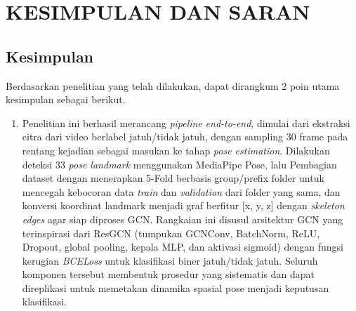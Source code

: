 \newpage
\chapter{KESIMPULAN DAN SARAN} \label{Bab V}

\section{Kesimpulan} \label{V.Kesimpulan}
Berdasarkan penelitian yang telah dilakukan, dapat dirangkum 2 poin utama kesimpulan sebagai berikut. 

\begin{enumerate}
    \item Penelitian ini berhasil merancang \textit{pipeline} \textit{end-to-end}, dimulai dari ekstraksi citra dari video berlabel jatuh/tidak jatuh, dengan sampling 30 frame pada rentang kejadian sebagai masukan ke tahap \textit{pose estimation}. Dilakukan deteksi 33 \textit{pose landmark} menggunakan MediaPipe Pose, lalu Pembagian dataset dengan menerapkan 5-Fold berbasis group/prefix folder untuk mencegah kebocoran data \textit{train} dan \textit{validation} dari folder yang sama, dan konversi koordinat landmark menjadi graf berfitur [x, y, z] dengan \textit{skeleton edges} agar siap diproses GCN. Rangkaian ini disusul arsitektur GCN yang terinspirasi dari ResGCN (tumpukan GCNConv, BatchNorm, ReLU, Dropout, global pooling, kepala MLP, dan aktivasi sigmoid) dengan fungsi kerugian \textit{BCELoss} untuk klasifikasi biner jatuh/tidak jatuh. Seluruh komponen tersebut membentuk prosedur yang sistematis dan dapat direplikasi untuk memetakan dinamika spasial pose menjadi keputusan klasifikasi.

\end{enumerate}
